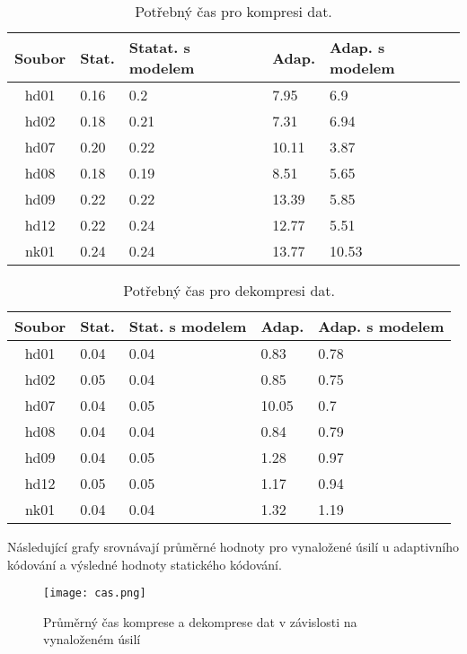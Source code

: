 \documentclass[11pt,a4paper,titlepage]{article}
\begin{document}
        \newpage
        \begin{table}[htbp]
            \centering
            \begin{tabular}{|c|l|l|l|l|}
                \hline Soubor & Stat. & Statat. s modelem & Adap. & Adap. s modelem \\ \hline
                hd01 & 0.16 & 0.2 & 7.95 & 6.9 \\
                hd02 & 0.18 & 0.21 & 7.31 & 6.94 \\
                hd07 & 0.20 & 0.22 & 10.11 & 3.87 \\
                hd08 & 0.18 & 0.19 & 8.51 & 5.65 \\
                hd09 & 0.22 & 0.22 & 13.39 & 5.85 \\
                hd12 & 0.22 & 0.24 & 12.77 & 5.51 \\
                nk01 & 0.24 & 0.24 & 13.77 & 10.53 \\ \hline
            \end{tabular}
            \caption{Potřebný čas pro kompresi dat.}
        \end{table}

        \begin{table}[htbp]
            \centering
            \begin{tabular}{|c|l|l|l|l|}
                \hline Soubor & Stat. & Stat. s modelem & Adap. & Adap. s modelem \\ \hline
                hd01 & 0.04 & 0.04 & 0.83 & 0.78 \\
                hd02 & 0.05 & 0.04 & 0.85 & 0.75 \\
                hd07 & 0.04 & 0.05 & 10.05 & 0.7 \\
                hd08 & 0.04 & 0.04 & 0.84 & 0.79 \\
                hd09 & 0.04 & 0.05 & 1.28 & 0.97 \\
                hd12 & 0.05 & 0.05 & 1.17 & 0.94 \\
                nk01 & 0.04 & 0.04 & 1.32 & 1.19 \\ \hline
            \end{tabular}
            \caption{Potřebný čas pro dekompresi dat.}
        \end{table}

        Následující grafy srovnávají průměrné hodnoty pro vynaložené úsilí u adaptivního kódování
        a výsledné hodnoty statického kódování.

        \begin{figure}[htbp]
            \begin{center}
                \texttt{[image: cas.png]}
                \caption{Průměrný čas komprese a dekomprese dat v závislosti na vynaloženém úsilí}
            \end{center}
        \end{figure}
\end{document}
